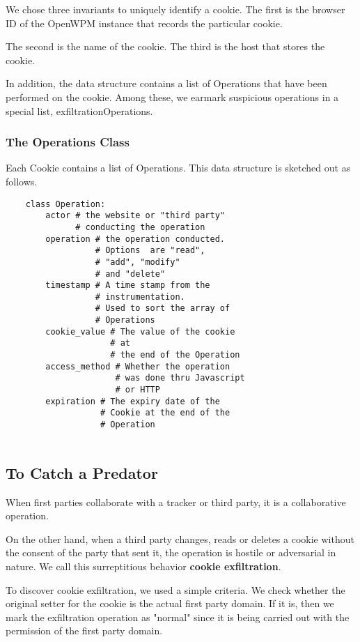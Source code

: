 \documentclass[sigplan,screen]{acmart}
\begin{document}
We chose three invariants to uniquely identify a cookie. The first is the browser ID of the OpenWPM instance that records the particular cookie. 

The second is the name of the cookie. The third is the host that stores the cookie.

In addition, the data structure contains a list of
Operations that have been performed on the cookie. Among these, we earmark suspicious operations in a special list, exfiltrationOperations.

\newpage

\subsubsection{The Operations Class}

Each Cookie contains a list of Operations. This data structure is sketched out as follows.


\begin{verbatim}
    class Operation:
        actor # the website or "third party"
              # conducting the operation
        operation # the operation conducted.
                  # Options  are "read", 
                  # "add", "modify" 
                  # and "delete"
        timestamp # A time stamp from the 
                  # instrumentation.
                  # Used to sort the array of 
                  # Operations
        cookie_value # The value of the cookie 
                     # at 
                     # the end of the Operation
        access_method # Whether the operation
                      # was done thru Javascript
                      # or HTTP
        expiration # The expiry date of the 
                   # Cookie at the end of the
                   # Operation
        
\end{verbatim}

\subsection{To Catch a Predator}
When first parties collaborate with a tracker or third party, it is a collaborative operation. 

On the other hand, when a third party changes, reads or deletes a cookie without the consent of the party that sent it, the operation is hostile or adversarial in nature. We call this surreptitious behavior \textbf{cookie exfiltration}.

To discover cookie exfiltration, we used a simple criteria. We check whether the original setter for the cookie is the actual first party domain. If it is, then we mark the exfiltration operation as "normal" since it is being carried out with the permission of the first party domain. 
\end{document}
